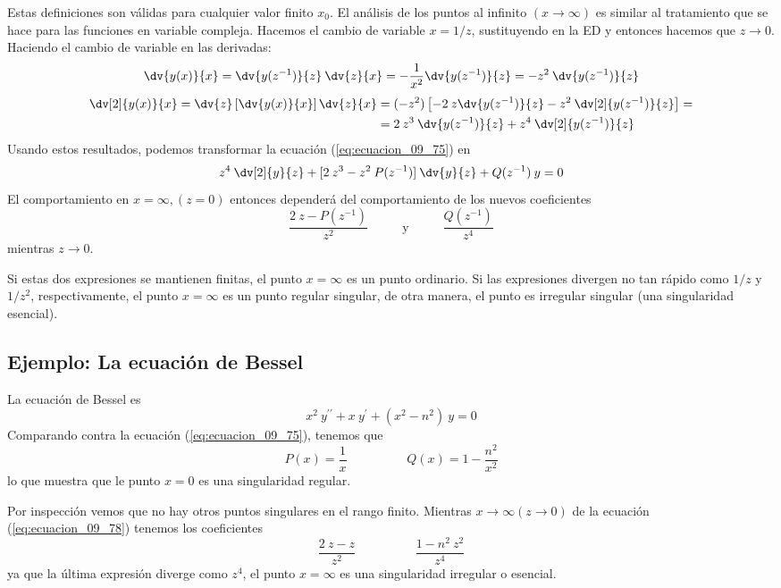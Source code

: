 \par
Estas definiciones son válidas para cualquier valor finito $x_{0}$. El análisis de los puntos al infinito $(x \to \infty)$ es similar al tratamiento que se hace para las funciones en variable compleja. Hacemos el cambio de variable $x = 1/z$, sustituyendo en la ED y entonces hacemos que $z \to 0$. Haciendo el cambio de variable en las derivadas:
\begin{equation}
\dv{y(x)}{x} = \dv{y(z^{-1})}{z} \: \dv{z}{x} = - \dfrac{1}{x^{2}} \dv{y(z^{-1})}{z} = -z^{2} \: \dv{y(z^{-1})}{z}
\label{eq:ecuacion_09_76}
\end{equation}
\begin{align}
\begin{aligned}
\dv[2]{y(x)}{x} = \dv{z} \left[ \dv{y(x)}{x} \right] \dv{z}{x} &= (-z^{2}) \left[ -2 \: z \dv{y(z^{-1})}{z} - z^{2} \: \dv[2]{y(z^{-1})}{z} \right] = \\
&= 2 \: z^{3} \: \dv{y(z^{-1})}{z} + z^{4} \: \dv[2]{y(z^{-1})}{z}
\end{aligned}
\end{align}
Usando estos resultados, podemos transformar la ecuación (\ref{eq:ecuacion_09_75}) en
\begin{equation}
z^{4} \: \dv[2]{y}{z} + [ 2 \: z^{3} - z^{2} \: P(z^{-1})] \: \dv{y}{z} + Q(z^{-1}) \: y = 0
\label{eq:ecuacion_09_78}
\end{equation}
El comportamiento en $x = \infty, (z = 0)$ entonces dependerá del comportamiento de los nuevos coeficientes
\[ \dfrac{2 \: z - P(z^{-1})}{z^{2}} \hspace{1cm} \text{ y } \hspace{1cm} \dfrac{Q(z^{-1})}{z^{4}}\]
mientras $z \to 0$.
\par
Si estas dos expresiones se mantienen finitas, el punto $x = \infty$ es un punto ordinario. Si las expresiones divergen no tan rápido como $1/z$ y $1/z^{2}$, respectivamente, el punto $x = \infty$ es un punto regular singular, de otra manera, el punto es irregular singular (una singularidad esencial).
\subsection*{Ejemplo: La ecuación de Bessel}
La ecuación de Bessel es
\begin{equation}
x^{2} \: y^{\prime \prime} + x \: y^{\prime} + (x^{2} - n^{2}) \: y = 0
\label{eq:ecuacion_09_79}
\end{equation}
Comparando contra la ecuación (\ref{eq:ecuacion_09_75}), tenemos que
\[ P(x) =  \dfrac{1}{x} \hspace{2cm} Q(x) = 1 - \dfrac{n^{2}}{x^{2}}\]
lo que muestra que le punto $x = 0$ es una singularidad regular.
\par
Por inspección vemos que no hay otros puntos singulares en el rango finito. Mientras $x \to \infty (z \to 0)$ de la ecuación (\ref{eq:ecuacion_09_78}) tenemos los coeficientes
\[ \dfrac{2 \:z - z}{z^{2}} \hspace{2cm} \dfrac{1 - n^{2} \: z^{2}}{z^{4}}\]
ya que la última expresión diverge como $z^{4}$, el punto $x = \infty$ es una singularidad irregular o esencial.
